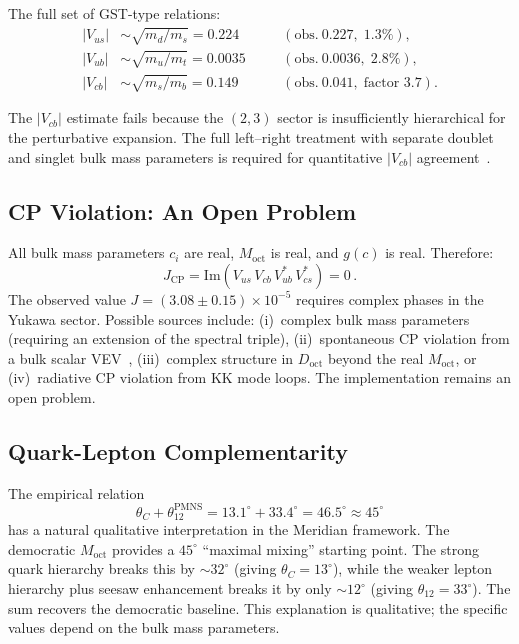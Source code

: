 The full set of GST-type relations:
\begin{equation}
\begin{aligned}
  |V_{us}| &\sim \sqrt{m_d/m_s} = 0.224 \quad &&(\mathrm{obs.\ }0.227,\; 1.3\%),\\
  |V_{ub}| &\sim \sqrt{m_u/m_t} = 0.0035 \quad &&(\mathrm{obs.\ }0.0036,\; 2.8\%),\\
  |V_{cb}| &\sim \sqrt{m_s/m_b} = 0.149 \quad &&(\mathrm{obs.\ }0.041,\; \text{factor 3.7}).
\end{aligned}
  \label{eq:4-81}
\end{equation}

The $|V_{cb}|$ estimate fails because the $(2,3)$ sector is insufficiently hierarchical for the perturbative expansion. The full left--right treatment with separate doublet and singlet bulk mass parameters is required for quantitative $|V_{cb}|$ agreement~\cite{ch4:Casagrande2008}.

\subsection{CP Violation: An Open Problem}
\label{sec:4-cp-violation}

All bulk mass parameters $c_i$ are real, $M_{\mathrm{oct}}$ is real, and $g(c)$ is real. Therefore:
\begin{equation}
  J_{\mathrm{CP}} = \mathrm{Im}(V_{us}\, V_{cb}\, V_{ub}^*\, V_{cs}^*) = 0\,.
  \label{eq:4-82}
\end{equation}
The observed value $J = (3.08 \pm 0.15) \times 10^{-5}$ requires complex phases in the Yukawa sector. Possible sources include: (i)~complex bulk mass parameters (requiring an extension of the spectral triple), (ii)~spontaneous CP violation from a bulk scalar VEV~\cite{ch4:BrancoGrimusLavoura1986}, (iii)~complex structure in $D_{\mathrm{oct}}$ beyond the real $M_{\mathrm{oct}}$, or (iv)~radiative CP violation from KK mode loops. The implementation remains an open problem.

\subsection{Quark-Lepton Complementarity}
\label{sec:4-qlc}

The empirical relation
\begin{equation}
  \theta_C + \theta_{12}^{\mathrm{PMNS}} = 13.1^\circ + 33.4^\circ = 46.5^\circ \approx 45^\circ
  \label{eq:4-83}
\end{equation}
has a natural qualitative interpretation in the Meridian framework. The democratic $M_{\mathrm{oct}}$ provides a $45^\circ$ ``maximal mixing'' starting point. The strong quark hierarchy breaks this by $\sim 32^\circ$ (giving $\theta_C = 13^\circ$), while the weaker lepton hierarchy plus seesaw enhancement breaks it by only $\sim 12^\circ$ (giving $\theta_{12} = 33^\circ$). The sum recovers the democratic baseline. This explanation is qualitative; the specific values depend on the bulk mass parameters.


